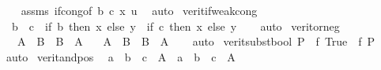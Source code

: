 \begin{isabellebody}
%
\isadelimproof
\ \ %
\endisadelimproof
%
\isatagproof
{}\isamarkupfalse%
\ assms\ if{\isacharunderscore}{\kern0pt}cong{\isacharbrackleft}{\kern0pt}of\ b\ c\ x\ u{\isacharbrackright}{\kern0pt}\ \isamarkupfalse%
\ auto%
\endisatagproof
{\isafoldproof}%
%
\isadelimproof
\isanewline
%
\endisadelimproof
\isanewline
{}\isamarkupfalse%
\ verit{\isacharunderscore}{\kern0pt}if{\isacharunderscore}{\kern0pt}weak{\isacharunderscore}{\kern0pt}cong{\isacharprime}{\kern0pt}{\isacharcolon}{\kern0pt}\isanewline
\ \ {\isacartoucheopen}b\ {\isasymequiv}\ c\ {\isasymLongrightarrow}\ {\isacharparenleft}{\kern0pt}if\ b\ then\ x\ else\ y{\isacharparenright}{\kern0pt}\ {\isasymequiv}\ {\isacharparenleft}{\kern0pt}if\ c\ then\ x\ else\ y{\isacharparenright}{\kern0pt}{\isacartoucheclose}\isanewline
%
\isadelimproof
\ \ %
\endisadelimproof
%
\isatagproof
{}\isamarkupfalse%
\ auto%
\endisatagproof
{\isafoldproof}%
%
\isadelimproof
\isanewline
%
\endisadelimproof
\isanewline
{}\isamarkupfalse%
\ verit{\isacharunderscore}{\kern0pt}or{\isacharunderscore}{\kern0pt}neg{\isacharcolon}{\kern0pt}\isanewline
\ \ \ {\isacartoucheopen}{\isacharparenleft}{\kern0pt}A\ {\isasymLongrightarrow}\ B{\isacharparenright}{\kern0pt}\ {\isasymLongrightarrow}\ B\ {\isasymor}\ {\isasymnot}A{\isacartoucheclose}\isanewline
\ \ \ {\isacartoucheopen}{\isacharparenleft}{\kern0pt}{\isasymnot}A\ {\isasymLongrightarrow}\ B{\isacharparenright}{\kern0pt}\ {\isasymLongrightarrow}\ B\ {\isasymor}\ A{\isacartoucheclose}\isanewline
%
\isadelimproof
\ \ %
\endisadelimproof
%
\isatagproof
{}\isamarkupfalse%
\ auto%
\endisatagproof
{\isafoldproof}%
%
\isadelimproof
\isanewline
%
\endisadelimproof
\isanewline
{}\isamarkupfalse%
\ verit{\isacharunderscore}{\kern0pt}subst{\isacharunderscore}{\kern0pt}bool{\isacharcolon}{\kern0pt}\ {\isacartoucheopen}P\ {\isasymLongrightarrow}\ f\ True\ {\isasymLongrightarrow}\ f\ P{\isacartoucheclose}\isanewline
%
\isadelimproof
\ \ %
\endisadelimproof
%
\isatagproof
{}\isamarkupfalse%
\ auto%
\endisatagproof
{\isafoldproof}%
%
\isadelimproof
\isanewline
%
\endisadelimproof
\isanewline
{}\isamarkupfalse%
\ verit{\isacharunderscore}{\kern0pt}and{\isacharunderscore}{\kern0pt}pos{\isacharcolon}{\kern0pt}\isanewline
\ \ {\isacartoucheopen}{\isacharparenleft}{\kern0pt}a\ {\isasymLongrightarrow}\ {\isasymnot}{\isacharparenleft}{\kern0pt}b\ {\isasymand}\ c{\isacharparenright}{\kern0pt}\ {\isasymor}\ A{\isacharparenright}{\kern0pt}\ {\isasymLongrightarrow}\ {\isasymnot}{\isacharparenleft}{\kern0pt}a\ {\isasymand}\ b\ {\isasymand}\ c{\isacharparenright}{\kern0pt}\ {\isasymor}\ A{\isacartoucheclose}\isanewline

\end{isabellebody}
